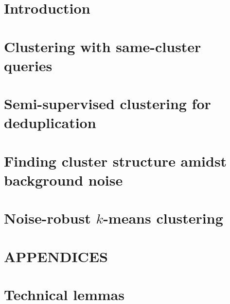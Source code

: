 \documentclass[letterpaper,12pt,titlepage,oneside,final]{book}
\let\origdoublepage\cleardoublepage
\newcommand{\clearemptydoublepage}{%
  \clearpage{\pagestyle{empty}\origdoublepage}}
\let\cleardoublepage\clearemptydoublepage
\begin{document}
 

\chapter{Introduction}
\label{chapter:introduction}


\chapter{Clustering with same-cluster queries}
\label{chapter:activeClustering}

\begin{subappendices}

\end{subappendices}

\chapter{Semi-supervised clustering for deduplication}
\label{chapter:deduplication}


\begin{subappendices}

\end{subappendices}

\chapter{Finding cluster structure amidst background noise}
\label{chapter:clusteringNoise}

\begin{subappendices}

\end{subappendices}

\chapter{Noise-robust $k$-means clustering}
\label{chapter:optimizationClustering}

\begin{subappendices}

\end{subappendices}


\cleardoublepage 
{}  

\renewcommand*{\bibname}{References}




\appendix
\chapter*{APPENDICES}
\chapter[Technical lemmas]{Technical lemmas}
\label{appendix:technicalLemmas}

\end{document}
